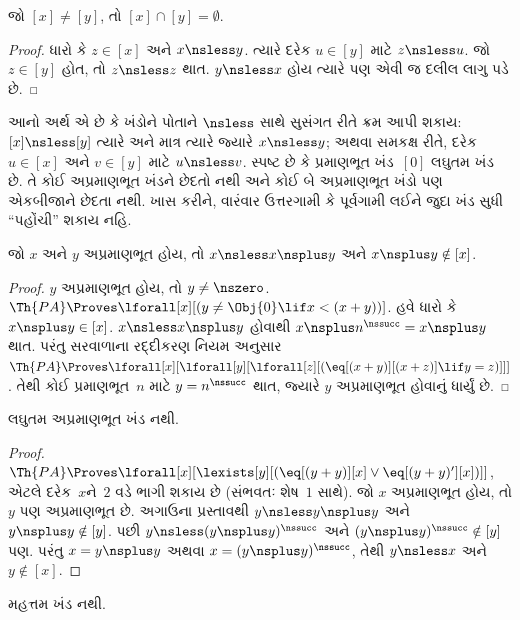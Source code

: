 \documentclass[../../../include/open-logic-section]{subfiles}
\begin{document}
\begin{cor}
જો $[x]\neq[y]$, તો $[x]\cap[y]=\emptyset$.
\end{cor}

\begin{proof}
ધારો કે $z\in[x]$ અને $x\nsless y$. ત્યારે દરેક $u\in[y]$ માટે
$z\nsless u$. જો $z\in[y]$ હોત, તો $z\nsless z$ થાત. $y\nsless x$
હોય ત્યારે પણ એવી જ દલીલ લાગુ પડે છે.
\end{proof}

\begin{explain}
આનો અર્થ એ છે કે ખંડોને પોતાને $\nsless$ સાથે સુસંગત રીતે ક્રમ આપી
શકાય: $[x]\nsless[y]$ ત્યારે અને માત્ર ત્યારે જ્યારે $x\nsless y$;
અથવા સમકક્ષ રીતે, દરેક $u\in[x]$ અને $v\in[y]$ માટે $u\nsless v$.
સ્પષ્ટ છે કે પ્રમાણભૂત ખંડ~$[0]$ લઘુતમ ખંડ છે. તે કોઈ અપ્રમાણભૂત
ખંડને છેદતો નથી અને કોઈ બે અપ્રમાણભૂત ખંડો પણ એકબીજાને છેદતા નથી.
ખાસ કરીને, વારંવાર ઉત્તરગામી કે પૂર્વગામી લઈને જુદા ખંડ સુધી
``પહોંચી'' શકાય નહિ.
\end{explain}

\begin{prop}
જો $x$ અને $y$ અપ્રમાણભૂત હોય, તો $x\nsless x\nsplus y$ અને
$x\nsplus y\notin[x]$.
\end{prop}

\begin{proof}
$y$ અપ્રમાણભૂત હોય, તો $y\neq\nszero$.
$\Th{PA}\Proves\lforall[x][(y\neq\Obj{0}\lif x<(x+y))]$. હવે ધારો
કે $x\nsplus y\in[x]$. $x\nsless x\nsplus y$ હોવાથી
$x\nsplus n^\nssucc=x\nsplus y$ થાત. પરંતુ સરવાળાના રદ્દીકરણ નિયમ અનુસાર
$\Th{PA}\Proves\lforall[x][\lforall[y][\lforall[z][(\eq[(x+y)][(x+z)]\lif y=z)]]]$.
તેથી કોઈ પ્રમાણભૂત~$n$ માટે $y=n^\nssucc$ થાત, જ્યારે
$y$ અપ્રમાણભૂત હોવાનું ધાર્યું છે.
\end{proof}

\begin{prop}
લઘુતમ અપ્રમાણભૂત ખંડ નથી.
\end{prop}

\begin{proof}
$\Th{PA}\Proves\lforall[x][\lexists[y][(\eq[(y+y)][x]\lor
\eq[(y+y)'][x])]]$, એટલે દરેક~$x$ને~$2$ વડે ભાગી શકાય છે (સંભવતઃ
શેષ~$1$ સાથે). જો $x$ અપ્રમાણભૂત હોય, તો $y$ પણ અપ્રમાણભૂત છે. અગાઉના
પ્રસ્તાવથી $y\nsless y\nsplus y$ અને $y\nsplus y\notin[y]$. પછી
$y\nsless(y\nsplus y)^\nssucc$ અને
$(y\nsplus y)^\nssucc\notin[y]$ પણ. પરંતુ
$x=y\nsplus y$ અથવા $x=(y\nsplus y)^\nssucc$, તેથી $y\nsless x$ અને
$y\notin[x]$.
\end{proof}

\begin{prop}
મહત્તમ ખંડ નથી.
\end{prop}
\end{document}
